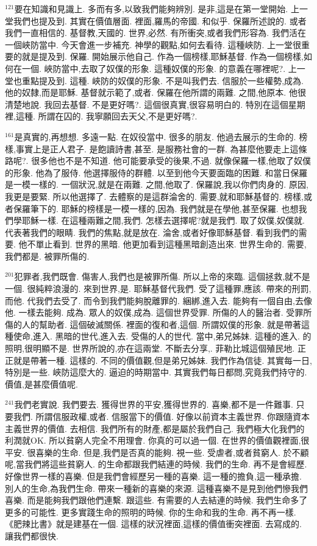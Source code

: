 \documentclass{book}
\begin{document}
$^{121}$要在知識和見識上.
多而有多,以致我們能夠辨別.
是非,這是在第一堂開始.
上一堂我們也提及到.
其實在價值層面.
裡面,羅馬的帝國.
和似乎.
保羅所述說的.
或者我們一直相信的.
基督教,天國的.
世界,必然.
有所衝突,或者我們形容為.
我們活在一個峽防當中.
今天會進一步補充.
神學的觀點,如何去看待.
這種峽防.
上一堂很重要的就是提及到.
保羅.
開始展示他自己.
作為一個榜樣,耶穌基督.
作為一個榜樣,如何在一個.
峽防當中,去取了奴僕的形象.
這種奴僕的形象.
的意義在哪裡呢?.
上一堂也重點提及到.
這種.
峽防的奴僕的形象.
不是叫我們去.
信服於一些權勢,成為.
他的奴隸,而是耶穌.
基督就示範了,或者.
保羅在他所謂的兩難.
之間,他原本.
他很清楚地說.
我回去基督.
不是更好嗎?.
這個很真實,很容易明白的.
特別在這個星期裡,這種.
所謂在囚的.
我寧願回去天父,不是更好嗎?.

$^{161}$是真實的,再想想.
多遠一點.
在奴役當中.
很多的朋友.
他過去展示的生命的.
榜樣,事實上是正人君子.
是飽讀詩書,甚至.
是服務社會的一群.
為甚麼他要走上這條路呢?.
很多他也不是不知道.
他可能要承受的後果,不過.
就像保羅一樣,他取了奴僕的形象.
他為了服侍.
他選擇服侍的群體.
以至到他今天要面臨的困難.
和當日保羅是一模一樣的.
一個狀況,就是在兩難.
之間,他取了.
保羅說,我以你們肉身的.
原因,我更是要緊.
所以他選擇了.
去體察的是這群淪舍的.
需要,就和耶穌基督的.
榜樣,或者保羅筆下的.
耶穌的榜樣是一模一樣的,因為.
我們就是在學他,甚至保羅.
也想我們學耶穌一樣.
在這種兩難之間,我們.
怎樣去選擇呢?就是我們.
取了奴僕,奴僕就.
代表著我們的眼睛.
我們的焦點,就是放在.
淪舍,或者好像耶穌基督.
看到我們的需要.
他不單止看到.
世界的黑暗.
他更加看到這種黑暗創造出來.
世界生命的.
需要,我們都是.
被罪所傷的.

$^{201}$犯罪者,我們既會.
傷害人,我們也是被罪所傷.
所以上帝的來臨.
這個拯救,就不是一個.
很純粹浪漫的.
來到世界,是.
耶穌基督代我們.
受了這種罪,應該.
帶來的刑罰,而他.
代我們去受了.
而令到我們能夠脫離罪的.
綑綁,進入去.
能夠有一個自由,去像他.
一樣去能夠.
成為.
眾人的奴僕,成為.
這個世界受罪.
所傷的人的醫治者.
受罪所傷的人的幫助者.
這個破滅關係.
裡面的復和者,這個.
所謂奴僕的形象.
就是帶著這種使命,進入.
黑暗的世代,進入去.
受傷的人的世代.
當中,弟兄姊妹.
這種的進入.
的照明,很明顯不是.
世界所說的,亦在這兩堂.
不斷去分享,.
菲勒比城這個殖民地.
正正就是帶著一種.
這樣的.
不同的價值觀,但是弟兄姊妹.
我們作為信徒.
其實每一日,特別是一些.
峽防這麼大的.
逼迫的時期當中.
其實我們每日都問,究竟我們持守的.
價值,是甚麼價值呢.

$^{241}$我們老實說.
我們要去.
獲得世界的平安,獲得世界的.
喜樂,都不是一件難事.
只要我們.
所謂信服政權,或者.
信服當下的價值.
好像以前資本主義世界.
你跟隨資本主義世界的價值.
去相信.
我們所有的財產,都是屬於我們自己.
我們極大化我們的利潤就OK.
所以貧窮人完全不用理會.
你真的可以過一個.
在世界的價值觀裡面,很平安.
很喜樂的生命.
但是,我們是否真的能夠.
視一些.
受虐者,或者貧窮人.
於不顧呢,當我們將這些貧窮人.
的生命都跟我們結連的時候.
我們的生命.
再不是會經歷.
好像世界一樣的喜樂.
但是我們會經歷另一種的喜樂.
這一種的擔負,這一種承擔.
別人的生命,為我們生命.
帶來一種新的喜樂的來源.
這種喜樂不是見到他們慘我們喜樂.
而是能夠我們跟他們連繫.
跟這些.
有需要的人去結連的時候.
我們生命多了更多的可能性.
更多實踐生命的照明的時候.
你的生命和我的生命.
再不再一樣.
《肥辣比書》就是建基在一個.
這樣的狀況裡面,這樣的價值衝突裡面.
去寫成的.
讓我們都很快.
\end{document}
